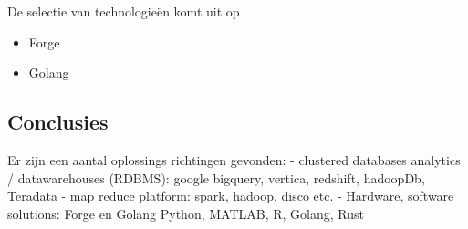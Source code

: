 De selectie van technologieën komt uit op

\begin{itemize}
    \item Forge
    \item Golang
\end{itemize}


\subsection{Conclusies}

Er zijn een aantal oplossings richtingen gevonden:
- clustered databases analytics / datawarehouses (RDBMS): google bigquery, vertica, redshift, hadoopDb, Teradata
- map reduce platform: spark, hadoop, disco etc.
- Hardware, software solutions: Forge en Golang Python, MATLAB, R, Golang, Rust


